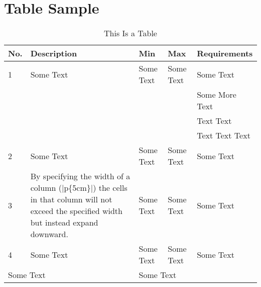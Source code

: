 \section{Table Sample}

\begin{table}[H]
\caption{This Is a Table\label{LABEL}}
\begin{tabular}{|l|p{5cm}|l|l|l|}
  \hline %
  \textbf{No.} &\textbf{Description} &\textbf{Min} &\textbf{Max} &\textbf{Requirements}    \\
  \hline %
  1            & Some Text           & Some Text   & Some Text   & Some Text               \\
               &                     &             &             & Some More Text          \\
               &                     &             &             & Text Text               \\
               &                     &             &             & Text Text Text          \\
  \hline %
  2            & Some Text           & Some Text   & Some Text   & Some Text               \\
  \hline %
  3            & By specifying the
                 width of a column
                 (|p\{5cm\}|) the
                 cells in that column
                 will not exceed the
                 specified width but         %
                 instead expand              %
                 downward.
                                     & Some Text           & Some Text   & Some Text       \\
  \hline %
  4            & Some Text           & Some Text   & Some Text   & Some Text               \\
  \hline %
  \multicolumn{2}{|l|}{Some Text}    & \multicolumn{3}{l|}{Some Text}                      \\
  \hline %

\end{tabular}
\end{table}
